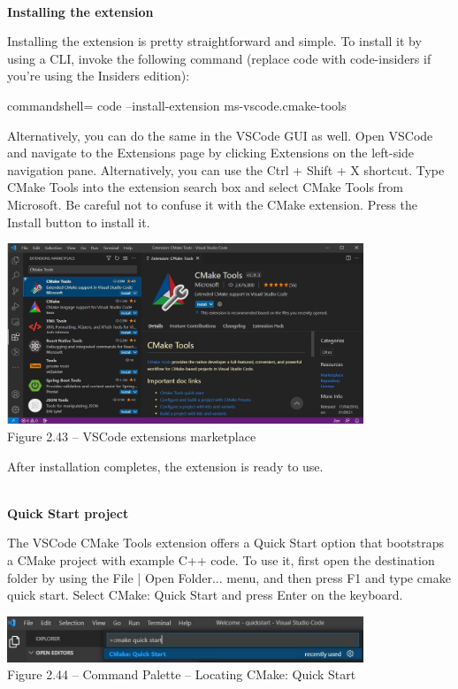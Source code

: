 \hspace*{\fill} \\ %
\noindent
\textbf{Installing the extension}

Installing the extension is pretty straightforward and simple. To install it by using a CLI, invoke the following command (replace code with code-insiders if you're using the Insiders edition):

\begin{tcblisting}{commandshell={}}
code --install-extension ms-vscode.cmake-tools
\end{tcblisting}

Alternatively, you can do the same in the VSCode GUI as well. Open VSCode and navigate to the Extensions page by clicking Extensions on the left-side navigation pane. Alternatively, you can use the Ctrl + Shift + X shortcut. Type CMake Tools into the extension search box and select CMake Tools from Microsoft. Be careful not to confuse it with the CMake extension. Press the Install button to install it.

\begin{center}
\includegraphics[width=0.8\textwidth]{content/1/chapter2/images/43.jpg}\\
Figure 2.43 – VSCode extensions marketplace
\end{center}

After installation completes, the extension is ready to use.

\hspace*{\fill} \\ %
\noindent
\textbf{Quick Start project}

The VSCode CMake Tools extension offers a Quick Start option that bootstraps a CMake project with example C++ code. To use it, first open the destination folder by using the File | Open Folder... menu, and then press F1 and type cmake quick start. Select CMake: Quick Start and press Enter on the keyboard.

\begin{center}
\includegraphics[width=0.8\textwidth]{content/1/chapter2/images/44.jpg}\\
Figure 2.44 – Command Palette – Locating CMake: Quick Start
\end{center}

